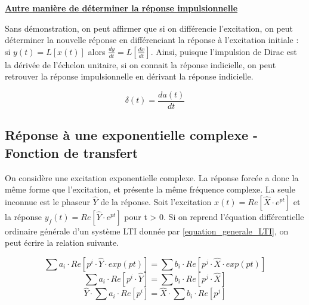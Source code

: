 	\vspace{0.5\baselineskip}
	
	\textbf{\underline{Autre manière de déterminer la réponse impulsionnelle}}
	
	Sans démonstration, on peut affirmer que si on différencie l'excitation, on peut déterminer la nouvelle réponse en différenciant la réponse à l'excitation initiale : si $y(t) = L[x(t)]$ alors $\frac{dy}{dt} = L[\frac{dx}{dt}] $.
	Ainsi, puisque l'impulsion de Dirac est la dérivée de l'échelon unitaire, si on connait la réponse indicielle, on peut retrouver la réponse impulsionnelle en dérivant la réponse indicielle.
	
	\begin{equation}\label{key}
	\delta(t)=\frac{da(t)}{dt}
	\end{equation}
	
	\vspace{0.5\baselineskip}
	
	
	\subsection{Réponse à une exponentielle complexe - Fonction de transfert}
	On considère une excitation exponentielle complexe. La réponse forcée a donc la même forme que l'excitation, et présente la même fréquence complexe. La seule inconnue est le phaseur $\hat{Y}$ de la réponse. Soit l'excitation $ x(t) = Re[\hat{X} \cdot e^{pt}]$ et la réponse $ y_{f}(t) = Re[\hat{Y} \cdot e^{pt}]$ pour t > 0. Si on reprend l'équation différentielle ordinaire générale d'un système LTI donnée par \ref{equation_generale_LTI}, on peut écrire la relation suivante.
	
	\begin{equation*}\label{}
	\sum a_{i} \cdot Re[p^{i} \cdot \hat{Y} \cdot exp(pt)] = \sum b_{i} \cdot Re[p^{j} \cdot \hat{X} \cdot exp(pt)]
	\end{equation*}
	\begin{equation*}\label{}
	\sum a_{i} \cdot Re[p^{i} \cdot \hat{Y}] = \sum b_{i} \cdot Re[p^{j} \cdot \hat{X}]
	\end{equation*}
	\begin{equation*}\label{}
	\hat{Y} \cdot \sum a_{i} \cdot Re[p^{i}] = \hat{X} \cdot \sum b_{i} \cdot Re[p^{j}]
	\end{equation*}
	
